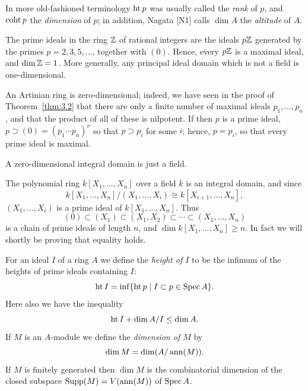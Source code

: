 \begin{remark}
In more old-fashioned terminology $\operatorname{ht} p$ was usually called the
\emph{rank} of $p$, and $\operatorname{coht} p$ the \emph{dimension} of $p$; in addition, Nagata [N1] calls
$\dim A$ the \emph{altitude} of $A$.
\end{remark}

\begin{example}\label{ex:5.1}
The prime ideals in the ring $\mathbb{Z}$ of rational integers are the ideals
$p\mathbb{Z}$ generated by the primes $p = 2, 3, 5, \ldots$, together with $(0)$. Hence, every $p\mathbb{Z}$
is a maximal ideal, and $\dim \mathbb{Z} = 1$. More generally, any principal ideal
domain which is not a field is one-dimensional.
\end{example}

\begin{example}\label{ex:5.2}
An Artinian ring is zero-dimensional; indeed, we have seen in
the proof of Theorem~\ref{thm:3.2} that there are only a finite number of maximal
ideals $p_1, \ldots, p_n$, and that the product of all of these is nilpotent. If then $p$ is a
prime ideal, $p \supset (0) = (p_1 \cdots p_n)^\nu$ so that $p \supset p_i$ for some $i$; hence, $p = p_i$, so
that every prime ideal is maximal.
\end{example}

\begin{example}\label{ex:5.3}
A zero-dimensional integral domain is just a field.
\end{example}

\begin{example}\label{ex:5.4}
The polynomial ring $k[X_1, \ldots, X_n]$ over a field $k$ is an integral
domain, and since
\[
  k[X_1, \ldots, X_n]/(X_1, \ldots, X_i) \cong k[X_{i+1}, \ldots, X_n],
\]
$(X_1, \ldots, X_i)$ is a prime ideal of $k[X_1, \ldots, X_n]$. Thus
\[
  (0) \subset (X_1) \subset (X_1, X_2) \subset \cdots \subset (X_1, \ldots, X_n)
\]
is a chain of prime ideals of length $n$, and $\dim k[X_1, \ldots, X_n] \ge n$. In fact we
will shortly be proving that equality holds.
\end{example}

For an ideal $I$ of a ring $A$ we define the \emph{height of $I$} to be the infimum of the
heights of prime ideals containing $I$:
\[
  \operatorname{ht} I = \inf\{\operatorname{ht} p \mid I \subset p \in \operatorname{Spec} A\}.
\]
Here also we have the inequality
\[
  \operatorname{ht} I + \dim A/I \le \dim A.
\]
If $M$ is an $A$-module we define the \emph{dimension of $M$} by
\[
  \dim M = \dim(A/\operatorname{ann}(M)).
\]
If $M$ is finitely generated then $\dim M$ is the combinatorial dimension of the
closed subspace $\operatorname{Supp}(M) = V(\operatorname{ann}(M))$ of $\operatorname{Spec} A$.

